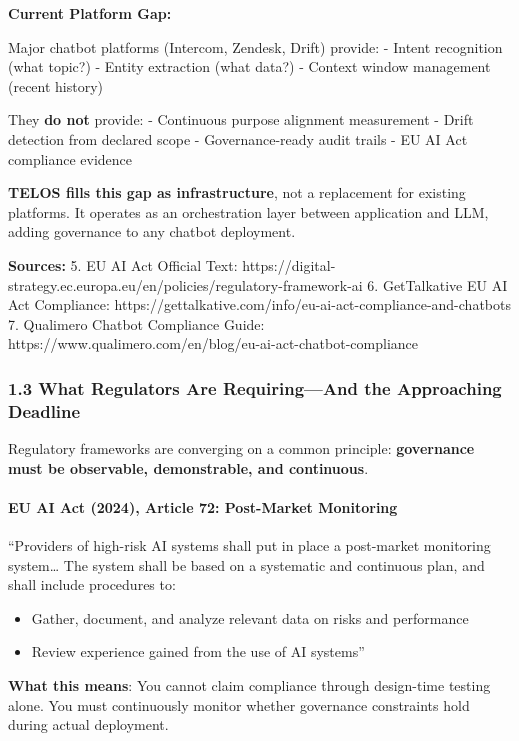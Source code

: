 \textbf{Current Platform Gap:}

Major chatbot platforms (Intercom, Zendesk, Drift) provide: - Intent
recognition (what topic?) - Entity extraction (what data?) - Context
window management (recent history)

They \textbf{do not} provide: - Continuous purpose alignment measurement
- Drift detection from declared scope - Governance-ready audit trails -
EU AI Act compliance evidence

\textbf{TELOS fills this gap as infrastructure}, not a replacement for
existing platforms. It operates as an orchestration layer between
application and LLM, adding governance to any chatbot deployment.

\textbf{Sources:} 5. EU AI Act Official Text:
https://digital-strategy.ec.europa.eu/en/policies/regulatory-framework-ai
6. GetTalkative EU AI Act Compliance:
https://gettalkative.com/info/eu-ai-act-compliance-and-chatbots 7.
Qualimero Chatbot Compliance Guide:
https://www.qualimero.com/en/blog/eu-ai-act-chatbot-compliance

\subsubsection{1.3 What Regulators Are Requiring---And the Approaching
Deadline}\label{what-regulators-are-requiringand-the-approaching-deadline}

Regulatory frameworks are converging on a common principle:
\textbf{governance must be observable, demonstrable, and continuous}.

\paragraph{EU AI Act (2024), Article 72: Post-Market
Monitoring}\label{eu-ai-act-2024-article-72-post-market-monitoring}

``Providers of high-risk AI systems shall put in place a post-market
monitoring system\ldots{} The system shall be based on a systematic and
continuous plan, and shall include procedures to:

\begin{itemize}
\tightlist
\item
  Gather, document, and analyze relevant data on risks and performance
\item
  Review experience gained from the use of AI systems''
\end{itemize}

\textbf{What this means}: You cannot claim compliance through
design-time testing alone. You must continuously monitor whether
governance constraints hold during actual deployment.

